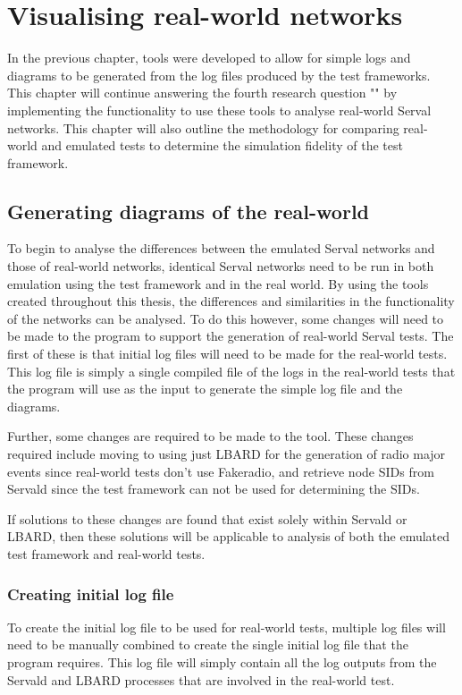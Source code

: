 
\chapter{Visualising real-world networks} %

\label{Chapter6} %


In the previous chapter, tools were developed to allow for simple logs and diagrams to be generated from the log files produced by the test frameworks.
This chapter will continue answering the fourth research question "\fourthRQ" by implementing the functionality to use these tools to analyse real-world Serval networks.
This chapter will also outline the methodology for comparing real-world and emulated tests to determine the simulation fidelity of the test framework.

\section{Generating diagrams of the real-world}   
To begin to analyse the differences between the emulated Serval networks and those of real-world networks, identical Serval networks need to be run in both emulation using the test framework and in the real world.
By using the tools created throughout this thesis, the differences and similarities in the functionality of the networks can be analysed.
To do this however, some changes will need to be made to the program to support the generation of real-world Serval tests.
The first of these is that initial log files will need to be made for the real-world tests.
This log file is simply a single compiled file of the logs in the real-world tests that the program will use as the input to generate the simple log file and the diagrams.

Further, some changes are required to be made to the tool.
These changes required include moving to using just LBARD for the generation of radio major events since real-world tests don't use Fakeradio, and retrieve node SIDs from Servald since the test framework can not be used for determining the SIDs.

If solutions to these changes are found that exist solely within Servald or LBARD, then these solutions will be applicable to analysis of both the emulated test framework and real-world tests.

\subsection{Creating initial log file}
To create the initial log file to be used for real-world tests, multiple log files will need to be manually combined to create the single initial log file that the program requires.
This log file will simply contain all the log outputs from the Servald and LBARD processes that are involved in the real-world test.

